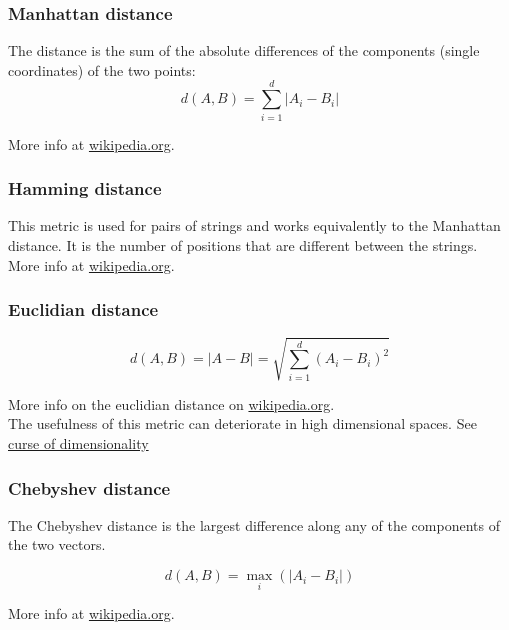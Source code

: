 \documentclass[
]{book}
\begin{document}
\hypertarget{manhattan-distance}{%
\subsubsection{Manhattan distance}\label{manhattan-distance}}

The distance is the sum of the absolute differences of the components
(single coordinates) of the two points:
\[d(A, B) = \sum_{i=1}^d | A_i - B_i |\]

More info at
\href{https://en.wikipedia.org/wiki/Taxicab_geometry}{wikipedia.org}.

\hypertarget{hamming-distance}{%
\subsubsection{Hamming distance}\label{hamming-distance}}

This metric is used for pairs of strings and works equivalently to the
Manhattan distance. It is the number of positions that are different
between the strings.\\
More info at
\href{https://en.wikipedia.org/wiki/Hamming_distance}{wikipedia.org}.

\hypertarget{euclidian-distance}{%
\subsubsection{Euclidian distance}\label{euclidian-distance}}

\[d(A, B) = | A - B | = \sqrt{\sum_{i=1}^d (A_i-B_i)^2} \]

More info on the euclidian distance on
\href{https://en.wikipedia.org/wiki/Euclidean_distance}{wikipedia.org}.\\
The usefulness of this metric can deteriorate in high dimensional
spaces. See \href{https://en.wikipedia.org/wiki/Curse_of_dimensionality\#Distance_function}{curse of
dimensionality}

\hypertarget{chebyshev-distance}{%
\subsubsection{Chebyshev distance}\label{chebyshev-distance}}

The Chebyshev distance is the largest difference along any of the
components of the two vectors.

\[d(A, B) = \max_i(|A_i-B_i|) \]

More info at
\href{https://en.wikipedia.org/wiki/Chebyshev_distance}{wikipedia.org}.
\end{document}
